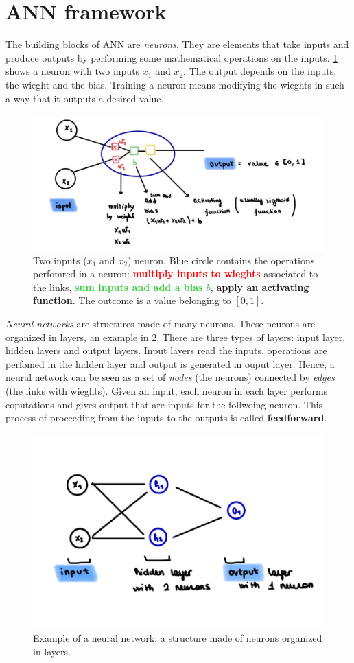 \documentclass[11pt]{article}
\begin{document}
\newpage

\section{ANN framework}

The building blocks of ANN are \textit{neurons}. They are elements that take inputs and produce outputs by performing some mathematical operations on the inputs. \cref{fig:neuron} shows a neuron with two inputs $x_1$ and $x_2$. The output depends on the inputs, the wieght and the bias. Training a neuron means modifying the wieghts in such a way that it outputs a desired value.
\begin{figure}[h]
    \centering
    \includegraphics[width=0.75\columnwidth]{figures_tex/neuron.png}
\caption{Two inputs ($x_1$ and $x_2$) neuron. Blue circle contains the operations perfomred in a neuron: \textcolor{red}{\textbf{multiply inputs to wieghts}} associated to the links, \textcolor{LimeGreen}{\textbf{sum inputs and add a bias $b$}}, \textcolor{Dandelion}{\textbf{apply an activating function}}. The outcome is a value belonging to $[0,1]$.}
    \label{fig:neuron}
\end{figure} 

\textit{Neural networks} are structures made of many neurons. These neurons are organized in layers, an example in \cref{fig:neural_ntw}. There are three types of layers: input layer, hidden layers and output layers. Input layers read the inputs, operations are perfomed in the hidden layer and output is generated in ouput layer. Hence, a neural network can be seen as a set of \textit{nodes} (the neurons) connected by \textit{edges} (the links with wieghts).
Given an input, each neuron in each layer performs coputations and gives output that are inputs for the follwoing neuron. This process of proceeding from the inputs to the outputs is called \textbf{feedforward}.
\begin{figure}[h]
    \centering
    \includegraphics[width=0.6\columnwidth]{figures_tex/neural_ntw.pdf}
    \caption{Example of a neural network: a structure made of neurons organized in layers.}
    \label{fig:neural_ntw}
\end{figure} 
\end{document}
